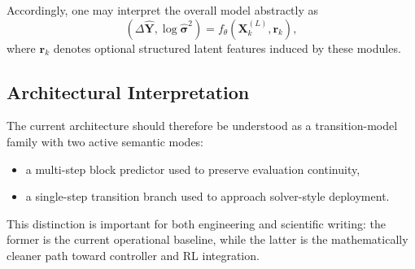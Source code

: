 Accordingly, one may interpret the overall model abstractly as
\begin{equation}
\left(
\Delta \hat{\mathbf{Y}},
\log \hat{\boldsymbol{\sigma}}^2
\right)
=
f_{\theta}\!\left(\mathbf{X}^{(L)}_k, \mathbf{r}_k\right),
\end{equation}
where $\mathbf{r}_k$ denotes optional structured latent features induced by these modules.

\subsection{Architectural Interpretation}

The current architecture should therefore be understood as a transition-model family with two active semantic modes:
\begin{itemize}
  \item a multi-step block predictor used to preserve evaluation continuity,
  \item a single-step transition branch used to approach solver-style deployment.
\end{itemize}

This distinction is important for both engineering and scientific writing:
the former is the current operational baseline, while the latter is the mathematically cleaner path toward controller and RL integration.
